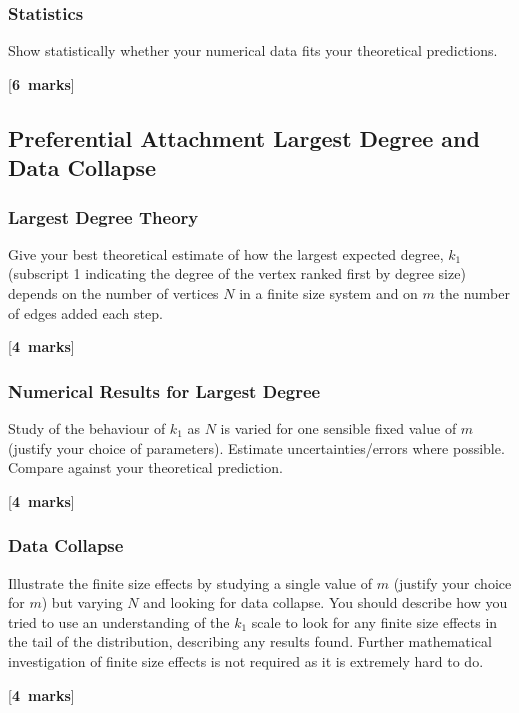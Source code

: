 \documentclass[a4paper,12pt]{article}
\newcounter{nmarks}
\newcommand{\qmarks}[1]{\addtocounter{nmarks}{#1} }
\renewcommand{\qmarks}[1]{\addtocounter{nmarks}{#1} \hspace*{\fill} [\textbf{#1~marks}]}
\begin{document}
\subsubsection{Statistics}
Show statistically whether your numerical data fits your theoretical predictions. \qmarks{6}


\subsection{Preferential Attachment Largest Degree and Data Collapse}


\subsubsection{Largest Degree Theory}
Give your best theoretical estimate of how the largest expected degree, $k_\mathrm{1}$ (subscript 1 indicating the degree of the vertex ranked first by degree size) depends on the number of vertices $N$ in a finite size system and on $m$ the number of edges added each step. \qmarks{4}

\subsubsection{Numerical Results for Largest Degree}
Study of the behaviour of $k_1$ as $N$ is varied for one sensible fixed value of $m$ (justify your choice of parameters). Estimate uncertainties/errors where possible. Compare against your theoretical prediction. \qmarks{4}

\subsubsection{Data Collapse}
Illustrate the finite size effects by studying a single value of $m$ (justify your choice for $m$) but varying $N$ and looking for data collapse. You should describe how you tried to use an understanding of the $k_1$ scale to look for any finite size effects in the tail of the distribution, describing any results found. Further mathematical investigation of finite size effects is not required as it is extremely hard to do. \qmarks{4}




\end{document}

